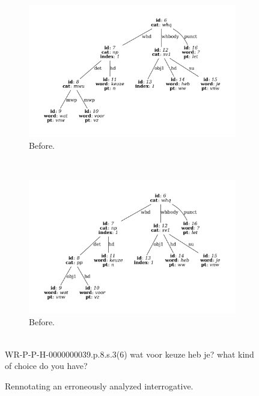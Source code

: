 \begin{figure}
	\centering
	\begin{subfigure}[b]{0.85\textwidth}
		\includegraphics[width=1\textwidth,trim={1.5cm 1.5cm 1.5cm 1.5}]{./prebuilt/watvoor_before.pdf}
		\caption{Before.}
	\end{subfigure}\\[\midsep]
	\begin{subfigure}[b]{0.75\textwidth}
			\includegraphics[width=1\textwidth,trim={1.5cm 1.5cm 1.5cm 1.5cm}]{./prebuilt/watvoor_after.pdf}
		\caption{Before.}
	\end{subfigure}\\[\smallsep]
	\lassycap
		{WR-P-P-H-0000000039.p.8.s.3(6)}
		{wat voor keuze heb je?}
		{what kind of choice do you have?}
	\caption{Rennotating an erroneously analyzed interrogative.}
	\label{figure:mwu:watvoor}
\end{figure}

